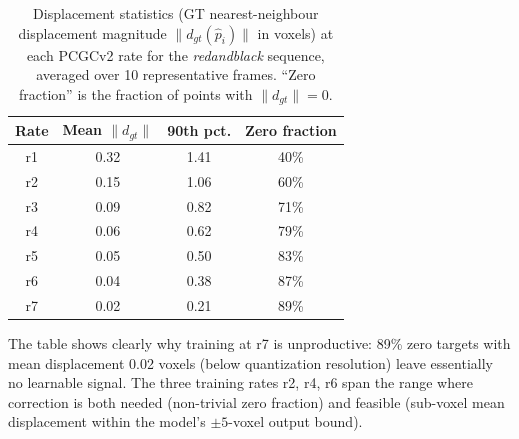 \begin{table}[h]
  \centering
  \caption{%
    Displacement statistics (GT nearest-neighbour displacement magnitude
    $\|d_{gt}(\hat{p}_i)\|$ in voxels) at each PCGCv2 rate for the
    \textit{redandblack} sequence, averaged over 10 representative frames.
    ``Zero fraction'' is the fraction of points with $\|d_{gt}\| = 0$.
  }
  \label{tab:displacement-full}
  \small
  \begin{tabular}{cccc}
    \toprule
    \textbf{Rate} & \textbf{Mean $\|d_{gt}\|$} &
    \textbf{90th pct.} & \textbf{Zero fraction} \\
    \midrule
    r1 & 0.32 & 1.41 & 40\% \\
    r2 & 0.15 & 1.06 & 60\% \\
    r3 & 0.09 & 0.82 & 71\% \\
    r4 & 0.06 & 0.62 & 79\% \\
    r5 & 0.05 & 0.50 & 83\% \\
    r6 & 0.04 & 0.38 & 87\% \\
    r7 & 0.02 & 0.21 & 89\% \\
    \bottomrule
  \end{tabular}
\end{table}

The table shows clearly why training at r7 is unproductive: 89\% zero targets
with mean displacement 0.02 voxels (below quantization resolution) leave
essentially no learnable signal.
The three training rates r2, r4, r6 span the range where correction is both
needed (non-trivial zero fraction) and feasible (sub-voxel mean displacement
within the model's $\pm5$-voxel output bound).
